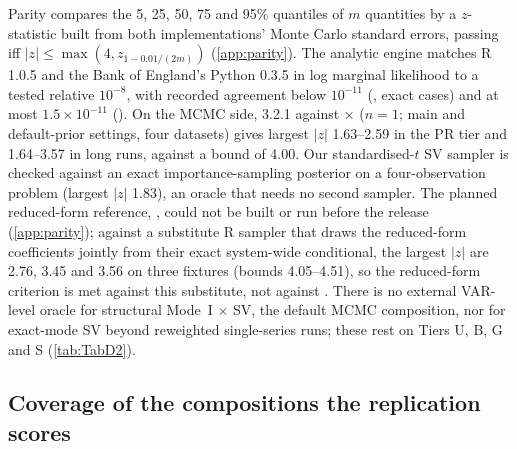 Parity compares the 5, 25, 50, 75 and 95\% quantiles of $m$ quantities by a $z$-statistic built
from both implementations' Monte Carlo standard errors, passing iff
$|z| \le \max(4, z_{1 - 0.01/(2m)})$ (\cref{app:parity}). %
The analytic engine matches R  1.0.5 \citep{kuschnig2021bvar} and the Bank of England's
Python  0.3.5 \citep{labonne2026bvar} in log marginal likelihood to a tested relative
$10^{-8}$, %
with recorded agreement below $10^{-11}$ (, exact cases) and at most
$1.5\times10^{-11}$ (). %
On the MCMC side,  3.2.1 \citep{kastner2016dealing,hosszejni2021modeling} against
 $\times$  ($n = 1$; main and default-prior settings, four datasets) gives
largest $|z|$ 1.63--2.59 in the PR tier and 1.64--3.57 in long runs, against a bound of 4.00. %
Our standardised-$t$ SV sampler is checked against an exact importance-sampling posterior on a
four-observation problem (largest $|z|$ 1.83), an oracle that needs no second sampler. %
The planned reduced-form reference,  \citep{gruber2026bayesianvars}, could not
be built or run before the release (\cref{app:parity}); against a substitute R sampler that draws the
reduced-form coefficients jointly from their exact system-wide conditional, the largest $|z|$ are
2.76, 3.45 and 3.56 on three fixtures (bounds 4.05--4.51), %
so the reduced-form criterion is met against this substitute, not against . There is no external VAR-level oracle for structural Mode~I $\times$ SV, the
default MCMC composition, nor for exact-mode SV beyond reweighted single-series runs; these rest on
Tiers U, B, G and S (\cref{tab:TabD2}). %

\subsection{Coverage of the compositions the replication scores}\label{sec:validation-coverage}

